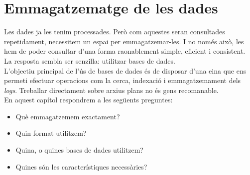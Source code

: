 \chapter{Emmagatzematge de les dades}\label{ch:log-storing}

Les dades ja les tenim processades.
Però com aquestes seran consultades repetidament, necessitem un espai per emmagatzemar-les.
I no només això, les hem de poder consultar d'una forma raonablement simple, eficient i consistent.
La resposta sembla ser senzilla: utilitzar bases de dades. \\

\noindent
L’objectiu principal de l’ús de bases de dades és de disposar d’una eina que ens permeti efectuar operacions com la cerca, indexació i emmagatzemament dels \textit{\gls{log}s}.
Treballar directament sobre arxius plans no és gens recomanable. \\

\noindent
En aquest capítol respondrem a les següents preguntes:
\begin{itemize}
    \item Què emmagatzemem exactament?
    \item Quin format utilitzem?
    \item Quina, o quines bases de dades utilitzem?
    \item Quines són les característiques necessàries?
\end{itemize}

\clearpage

\clearpage

